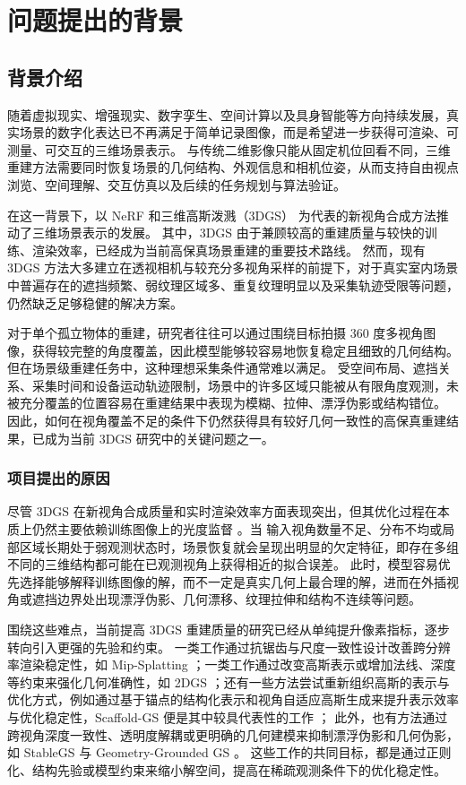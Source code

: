 \section{问题提出的背景}

\subsection{背景介绍}

随着虚拟现实、增强现实、数字孪生、空间计算以及具身智能等方向持续发展，真实场景的数字化表达已不再满足于简单记录图像，而是希望进一步获得可渲染、可测量、可交互的三维场景表示。
与传统二维影像只能从固定机位回看不同，三维重建方法需要同时恢复场景的几何结构、外观信息和相机位姿，从而支持自由视点浏览、空间理解、交互仿真以及后续的任务规划与算法验证。

在这一背景下，以 NeRF \cite{mildenhall2021nerf} 和三维高斯泼溅（3DGS）\cite{kerbl2023} 为代表的新视角合成方法推动了三维场景表示的发展。
其中，3DGS 由于兼顾较高的重建质量与较快的训练、渲染效率，已经成为当前高保真场景重建的重要技术路线。
然而，现有 3DGS 方法大多建立在透视相机与较充分多视角采样的前提下，对于真实室内场景中普遍存在的遮挡频繁、弱纹理区域多、重复纹理明显以及采集轨迹受限等问题，仍然缺乏足够稳健的解决方案。

对于单个孤立物体的重建，研究者往往可以通过围绕目标拍摄 360 度多视角图像，获得较完整的角度覆盖，因此模型能够较容易地恢复稳定且细致的几何结构。
但在场景级重建任务中，这种理想采集条件通常难以满足。
受空间布局、遮挡关系、采集时间和设备运动轨迹限制，场景中的许多区域只能被从有限角度观测，未被充分覆盖的位置容易在重建结果中表现为模糊、拉伸、漂浮伪影或结构错位。
因此，如何在视角覆盖不足的条件下仍然获得具有较好几何一致性的高保真重建结果，已成为当前 3DGS 研究中的关键问题之一。

\subsubsection{项目提出的原因}

尽管 3DGS 在新视角合成质量和实时渲染效率方面表现突出，但其优化过程在本质上仍然主要依赖训练图像上的光度监督 \cite{kerbl2023}。当
输入视角数量不足、分布不均或局部区域长期处于弱观测状态时，场景恢复就会呈现出明显的欠定特征，即存在多组不同的三维结构都可能在已观测视角上获得相近的拟合误差。
此时，模型容易优先选择能够解释训练图像的解，而不一定是真实几何上最合理的解，进而在外插视角或遮挡边界处出现漂浮伪影、几何漂移、纹理拉伸和结构不连续等问题。

围绕这些难点，当前提高 3DGS 重建质量的研究已经从单纯提升像素指标，逐步转向引入更强的先验和约束。
一类工作通过抗锯齿与尺度一致性设计改善跨分辨率渲染稳定性，如 Mip-Splatting \cite{yu2024mipsplatting}；一类工作通过改变高斯表示或增加法线、深度等约束来强化几何准确性，如 2DGS \cite{huang2024twodgs}；还有一些方法尝试重新组织高斯的表示与优化方式，例如通过基于锚点的结构化表示和视角自适应高斯生成来提升表示效率与优化稳定性，Scaffold-GS 便是其中较具代表性的工作 \cite{lu2024scaffold}；
此外，也有方法通过跨视角深度一致性、透明度解耦或更明确的几何建模来抑制漂浮伪影和几何伪影，如 StableGS 与 Geometry-Grounded GS \cite{wang2025stablegs,zhang2026geometrygroundedgs}。
这些工作的共同目标，都是通过正则化、结构先验或模型约束来缩小解空间，提高在稀疏观测条件下的优化稳定性。

